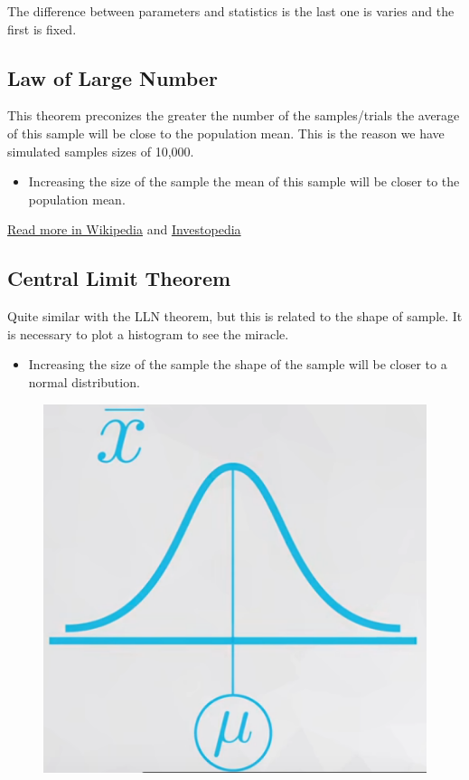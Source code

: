 \documentclass[]{book}
\providecommand{\tightlist}{%
  \setlength{\itemsep}{0pt}\setlength{\parskip}{0pt}}
\begin{document}
The difference between parameters and statistics is the last one is
varies and the first is fixed.

\subsection{Law of Large Number}\label{law-of-large-number}

This theorem preconizes the greater the number of the samples/trials the
average of this sample will be close to the population mean. This is the
reason we have simulated samples sizes of 10,000.

\begin{itemize}
\tightlist
\item
  Increasing the size of the sample the mean of this sample will be
  closer to the population mean.
\end{itemize}

\href{https://en.wikipedia.org/wiki/Law_of_large_numbers}{Read more in
Wikipedia} and
\href{https://www.investopedia.com/terms/l/lawoflargenumbers.asp}{Investopedia}

\subsection{Central Limit Theorem}\label{central-limit-theorem}

Quite similar with the LLN theorem, but this is related to the shape of
sample. It is necessary to plot a histogram to see the miracle.

\begin{itemize}
\tightlist
\item
  Increasing the size of the sample the shape of the sample will be
  closer to a normal distribution.
\end{itemize}

\begin{figure}
\centering
\includegraphics{01-img/c4_l10_02.png}
\caption{}
\end{figure}
\end{document}
